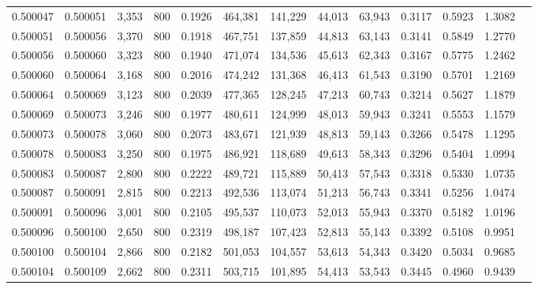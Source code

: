 \begin{tabular}{rrrrrrrrrrrrr}
0.500047 & 0.500051 &  3,353 &   800 &                                     0.1926 & 464,381 & 141,229 &  44,013 &  63,943 & 0.3117 & 0.5923 & 1.3082 \\
0.500051 & 0.500056 &  3,370 &   800 &                                     0.1918 & 467,751 & 137,859 &  44,813 &  63,143 & 0.3141 & 0.5849 & 1.2770 \\
0.500056 & 0.500060 &  3,323 &   800 &                                     0.1940 & 471,074 & 134,536 &  45,613 &  62,343 & 0.3167 & 0.5775 & 1.2462 \\
0.500060 & 0.500064 &  3,168 &   800 &                                     0.2016 & 474,242 & 131,368 &  46,413 &  61,543 & 0.3190 & 0.5701 & 1.2169 \\
0.500064 & 0.500069 &  3,123 &   800 &                                     0.2039 & 477,365 & 128,245 &  47,213 &  60,743 & 0.3214 & 0.5627 & 1.1879 \\
0.500069 & 0.500073 &  3,246 &   800 &                                     0.1977 & 480,611 & 124,999 &  48,013 &  59,943 & 0.3241 & 0.5553 & 1.1579 \\
0.500073 & 0.500078 &  3,060 &   800 &                                     0.2073 & 483,671 & 121,939 &  48,813 &  59,143 & 0.3266 & 0.5478 & 1.1295 \\
0.500078 & 0.500083 &  3,250 &   800 &                                     0.1975 & 486,921 & 118,689 &  49,613 &  58,343 & 0.3296 & 0.5404 & 1.0994 \\
0.500083 & 0.500087 &  2,800 &   800 &                                     0.2222 & 489,721 & 115,889 &  50,413 &  57,543 & 0.3318 & 0.5330 & 1.0735 \\
0.500087 & 0.500091 &  2,815 &   800 &                                     0.2213 & 492,536 & 113,074 &  51,213 &  56,743 & 0.3341 & 0.5256 & 1.0474 \\
0.500091 & 0.500096 &  3,001 &   800 &                                     0.2105 & 495,537 & 110,073 &  52,013 &  55,943 & 0.3370 & 0.5182 & 1.0196 \\
0.500096 & 0.500100 &  2,650 &   800 &                                     0.2319 & 498,187 & 107,423 &  52,813 &  55,143 & 0.3392 & 0.5108 & 0.9951 \\
0.500100 & 0.500104 &  2,866 &   800 &                                     0.2182 & 501,053 & 104,557 &  53,613 &  54,343 & 0.3420 & 0.5034 & 0.9685 \\
0.500104 & 0.500109 &  2,662 &   800 &                                     0.2311 & 503,715 & 101,895 &  54,413 &  53,543 & 0.3445 & 0.4960 & 0.9439 \\

\end{tabular}
